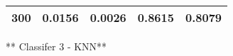 \documentclass{ctexart}
\begin{document}
\begin{longtable}[]{@{}ccccc@{}}
\begin{minipage}[t]{0.16\columnwidth}\centering\strut
300\strut
\end{minipage} & \begin{minipage}[t]{0.21\columnwidth}\centering\strut
0.0156\strut
\end{minipage} & \begin{minipage}[t]{0.20\columnwidth}\centering\strut
0.0026\strut
\end{minipage} & \begin{minipage}[t]{0.15\columnwidth}\centering\strut
0.8615\strut
\end{minipage} & \begin{minipage}[t]{0.14\columnwidth}\centering\strut
0.8079\strut
\end{minipage}\tabularnewline
\bottomrule
\end{longtable}

** Classifer 3 - KNN**
\end{document}
